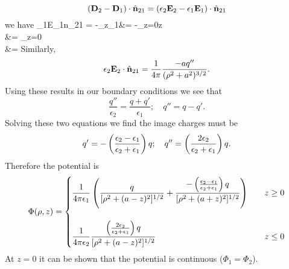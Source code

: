 \documentclass[11pt,letterpaper]{article}
\begin{document}
	\[
		(\mathbf{D}_2-\mathbf{D}_1)\cdot \hat{\mathbf{n}}_{21} = (\epsilon_2 \mathbf{E}_2 - \epsilon_1 \mathbf{E}_1)\cdot \hat{\mathbf{n}}_{21} 
	\]
	we have
	\ba
		\epsilon_1\vect E_1\cdot \vecth n_{21} =  -\del_z\Phi_1&= -_{z=0}\vecth z\\
		&= 
		_{z=0}\\
		&= 
	\ea
	Similarly, 
	\[
		\epsilon_2\mathbf{E}_2\cdot \hat{\mathbf{n}}_{21} = \frac{1}{4\pi}\frac{-aq''}{(\rho^2+a^2)^{3/2}}.
	\]
	Using these results in our boundary conditions we see that
	\[
		\frac{q''}{\epsilon_2} = \frac{q+q'}{\epsilon_1};\quad q'' = q-q'.
	\]
	Solving these two equations we find the image charges must be
	\[
		q' = -\left(\frac{\epsilon_2-\epsilon_1}{\epsilon_2+\epsilon_1}\right)q;\quad 
		q'' = \left(\frac{2\epsilon_2}{\epsilon_2+\epsilon_1}\right)q.
	\]
	Therefore the potential is
	\[
		\Phi(\rho,z) = \begin{cases}
		\displaystyle \frac{1}{4\pi\epsilon_1}\left(\frac{q}{ [\rho^2+(a-z)^2]^{1/2}}+\frac{-\left(\frac{\epsilon_2-\epsilon_1}{\epsilon_2+\epsilon_1}\right)
		q}{ [\rho^2+(a+z)^2]^{1/2}}\right)&\quad z\ge 0 \\ \\
		\displaystyle  \frac{1}{4\pi\epsilon_2}\frac{\left(\frac{2\epsilon_2}{\epsilon_2+\epsilon_1}\right)q}{ [\rho^2+(a-z)^2]^{1/2}}&\quad z\le0
		\end{cases}
	\]
	At $z=0$ it can be shown that the potential is continuous ($\Phi_1 = \Phi_2$). 
\end{document}

